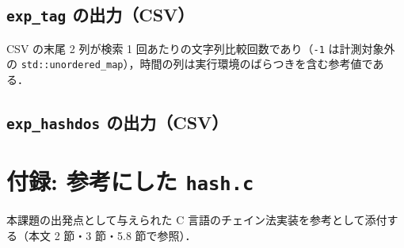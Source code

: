 \subsection{{\tt exp\_tag} の出力（CSV）}

CSV の末尾 2 列が検索 1 回あたりの文字列比較回数であり（{\tt -1} は計測対象外の {\tt std::unordered\_map}），時間の列は実行環境のばらつきを含む参考値である．

{\scriptsize}

\subsection{{\tt exp\_hashdos} の出力（CSV）}
{\scriptsize}

\section{付録: 参考にした {\tt hash.c}}

本課題の出発点として与えられた C 言語のチェイン法実装を参考として添付する（本文 2 節・3 節・5.8 節で参照）．

{\scriptsize}
